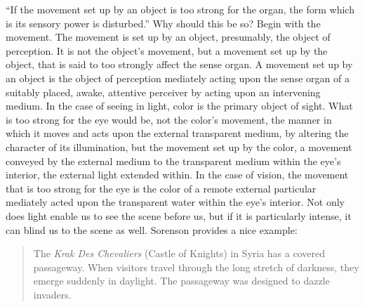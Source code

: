 ``If the movement set up by an object is too strong for the organ, the form which is its sensory power is disturbed.'' Why should this be so? Begin with the movement. The movement is set up by an object, presumably, the object of perception. It is not the object's movement, but a movement set up by the object, that is said to too strongly affect the sense organ. A movement set up by an object is the object of perception mediately acting upon the sense organ of a suitably placed, awake, attentive perceiver by acting upon an intervening medium. In the case of seeing in light, color is the primary object of sight. What is too strong for the eye would be, not the color's movement, the manner in which it moves and acts upon the external transparent medium, by altering the character of its illumination, but the movement set up by the color, a movement conveyed by the external medium to the transparent medium within the eye's interior, the external light extended within. In the case of vision, the movement that is too strong for the eye is the color of a remote external particular mediately acted upon the transparent water within the eye's interior. Not only does light enable us to see the scene before us, but if it is particularly intense, it can blind us to the scene as well. Sorenson provides a nice example:
\begin{quote}
	The \emph{Krak Des Chevaliers} (Castle of Knights) in Syria has a covered passageway. When visitors travel through the long stretch of darkness, they emerge suddenly in daylight. The passageway was designed to dazzle invaders. \citep[6]{Sorensen:2008kx}
\end{quote}

